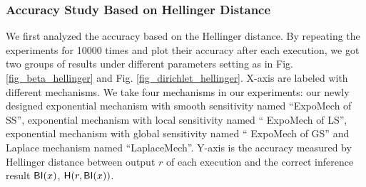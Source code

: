 \subsubsection{Accuracy Study Based on Hellinger Distance}
\label{subsec_accuracy_hellinger}
We first analyzed the accuracy based on the Hellinger distance. By repeating the experiments for 10000 times and plot their accuracy after each execution, we got two groups of results under different parameters setting as in Fig. \ref{fig_beta_hellinger} and Fig. \ref{fig_dirichlet_hellinger}. X-axis are labeled with different mechanisms. We take four mechanisms in our experiments: our newly designed exponential mechanism with smooth sensitivity named ``ExpoMech of SS'', exponential mechanism with local sensitivity named `` ExpoMech of LS'', exponential mechanism with global sensitivity named `` ExpoMech of GS'' and Laplace mechanism named ``LaplaceMech''. Y-axis is the accuracy measured by Hellinger distance between output $r$ of each execution and the correct inference result $\mathsf{BI}(x)$, $\mathsf{H}(r, \mathsf{BI}(x))$.


